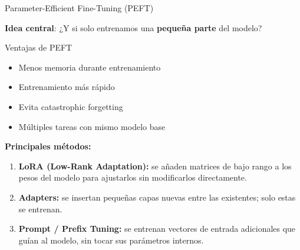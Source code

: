 \begin{frame}{Parameter-Efficient Fine-Tuning (PEFT)}

\textbf{Idea central}: ¿Y si solo entrenamos una \textbf{pequeña parte} del modelo?

\begin{block}{Ventajas de PEFT}
\begin{itemize}
    \item Menos memoria durante entrenamiento
    \item Entrenamiento más rápido
    \item Evita catastrophic forgetting
    \item Múltiples tareas con mismo modelo base
\end{itemize}
\end{block}

\textbf{Principales métodos:}
\begin{enumerate}
    \item \textbf{LoRA (Low-Rank Adaptation):} se añaden matrices de bajo rango a los pesos del modelo para ajustarlos sin modificarlos directamente.
    \item \textbf{Adapters:} se insertan pequeñas capas nuevas entre las existentes; solo estas se entrenan.
    \item \textbf{Prompt / Prefix Tuning:} se entrenan vectores de entrada adicionales que guían al modelo, sin tocar sus parámetros internos.
\end{enumerate}

\end{frame}

